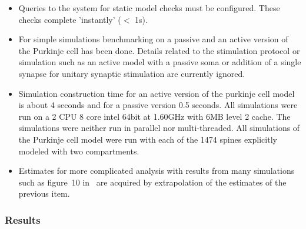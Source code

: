 \documentclass[12pt]{article}
\begin{document}
\begin{itemize}
\item Queries to the system for static model checks must be
  configured.  These checks complete 'instantly' ($<$ 1s).
\item For simple simulations benchmarking on a passive and an active
  version of the Purkinje cell has been done.  Details related to the
  stimulation protocol or simulation such as an active model with a
  passive soma or addition of a single synapse for unitary synaptic
  stimulation are currently ignored.
\item Simulation construction time for an active version of the
  purkinje cell model is about 4 seconds and for a passive version 0.5
  seconds.  All simulations were run on a 2 CPU 8 core intel 64bit at
  1.60GHz with 6MB level 2 cache.  The simulations were neither run in
  parallel nor multi-threaded.  All simulations of the Purkinje cell
  model were run with each of the 1474 spines explicitly modeled with
  two compartments.
\item Estimates for more complicated analysis with results from many
  simulations such as figure~10 in~\cite{E:1994hc} are acquired by
  extrapolation of the estimates of the previous item.
\end{itemize}


\subsubsection*{Results}
\end{document}
